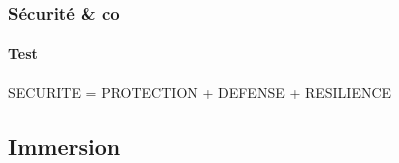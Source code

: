 
\begin{frame}[c]{}
	\frametitle{Sécurité \& co}
	\framesubtitle{Test}
	\centering \Large {}SECURITE = PROTECTION + DEFENSE + RESILIENCE
\end{frame}
\subsection{Immersion}	

